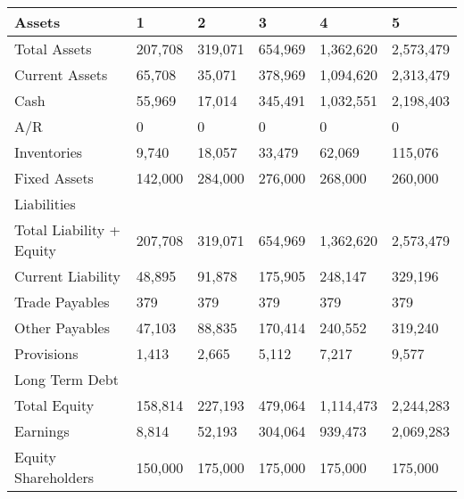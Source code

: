 \begin{tabular}{llllll}
\hline
 Assets                   & 1       & 2       & 3       & 4         & 5         \\
\hline
 Total Assets             & 207,708 & 319,071 & 654,969 & 1,362,620 & 2,573,479 \\
 Current Assets           & 65,708  & 35,071  & 378,969 & 1,094,620 & 2,313,479 \\
 Cash                     & 55,969  & 17,014  & 345,491 & 1,032,551 & 2,198,403 \\
 A/R                      & 0       & 0       & 0       & 0         & 0         \\
 Inventories              & 9,740   & 18,057  & 33,479  & 62,069    & 115,076   \\
 Fixed Assets             & 142,000 & 284,000 & 276,000 & 268,000   & 260,000   \\
 Liabilities              &         &         &         &           &           \\
 Total Liability + Equity & 207,708 & 319,071 & 654,969 & 1,362,620 & 2,573,479 \\
 Current Liability        & 48,895  & 91,878  & 175,905 & 248,147   & 329,196   \\
 Trade Payables           & 379     & 379     & 379     & 379       & 379       \\
 Other Payables           & 47,103  & 88,835  & 170,414 & 240,552   & 319,240   \\
 Provisions               & 1,413   & 2,665   & 5,112   & 7,217     & 9,577     \\
 Long Term Debt           &         &         &         &           &           \\
 Total Equity             & 158,814 & 227,193 & 479,064 & 1,114,473 & 2,244,283 \\
 Earnings                 & 8,814   & 52,193  & 304,064 & 939,473   & 2,069,283 \\
 Equity Shareholders      & 150,000 & 175,000 & 175,000 & 175,000   & 175,000   \\
\hline
\end{tabular}